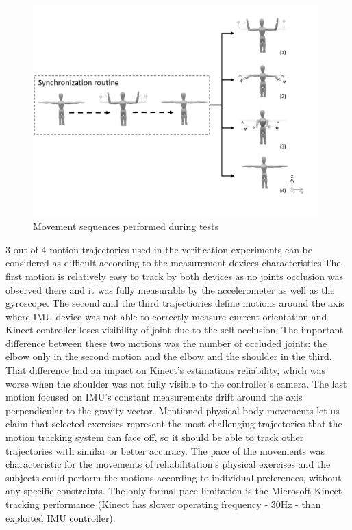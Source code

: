 \documentclass[sensors,article,submit,moreauthors,pdftex,10pt,a4paper]{mdpi}
\begin{document}
\begin{figure}[H] %
	\centering
	\includegraphics[width=11cm]{Figure16.png}
	\caption{Movement sequences performed during tests}
	\label{fig:results:sequences}
\end{figure}


3 out of 4 motion trajectories used in the verification experiments can be considered as difficult according to the measurement devices characteristics.The first motion is relatively easy to track by both devices as no joints occlusion was observed there and it was fully measurable by the accelerometer as well as the gyroscope. The second and the third trajectiories define motions around the axis where IMU device was not able to correctly measure current orientation and Kinect controller loses visibility of joint due to the self occlusion. The important difference between these two motions was the number of occluded joints: the elbow only in the second motion and the elbow and the shoulder in the third. That difference had an impact on Kinect's estimations reliability, which was worse when the shoulder was not fully visible to the controller's camera. The last motion focused on IMU's constant measurements drift around the axis perpendicular to the gravity vector. Mentioned physical body movements let us claim that selected exercises represent the most challenging trajectories that the motion tracking system can face off, so it should be able to track other trajectories with similar or better accuracy. The pace of the movements was characteristic for the movements of rehabilitation's physical exercises and the subjects could perform the motions according to individual preferences, without any specific constraints. The only formal pace limitation is the Microsoft Kinect tracking performance (Kinect has slower operating frequency - 30Hz - than exploited IMU controller).
\end{document}
